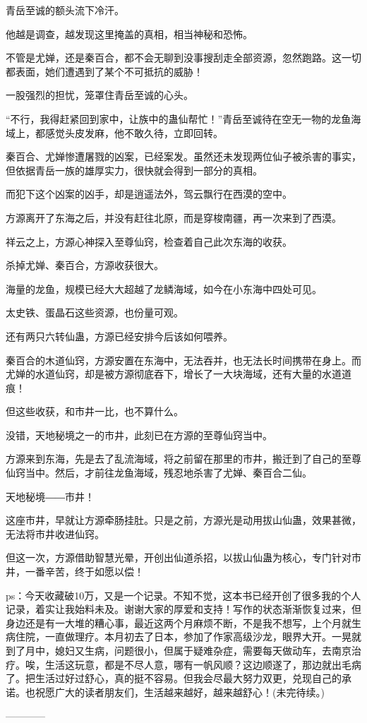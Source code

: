\begin{this_body}
青岳至诚的额头流下冷汗。

他越是调查，越发现这里掩盖的真相，相当神秘和恐怖。

不管是尤婵，还是秦百合，都不会无聊到没事搜刮走全部资源，忽然跑路。这一切都表面，她们遭遇到了某个不可抵抗的威胁！

一股强烈的担忧，笼罩住青岳至诚的心头。

“不行，我得赶紧回到家中，让族中的蛊仙帮忙！”青岳至诚待在空无一物的龙鱼海域上，都感觉头皮发麻，他不敢久待，立即回转。

秦百合、尤婵惨遭屠戮的凶案，已经案发。虽然还未发现两位仙子被杀害的事实，但依据青岳一族的雄厚实力，很快就会得到一部分的真相。

而犯下这个凶案的凶手，却是逍遥法外，驾云飘行在西漠的空中。

方源离开了东海之后，并没有赶往北原，而是穿梭南疆，再一次来到了西漠。

祥云之上，方源心神探入至尊仙窍，检查着自己此次东海的收获。

杀掉尤婵、秦百合，方源收获很大。

海量的龙鱼，规模已经大大超越了龙鳞海域，如今在小东海中四处可见。

太史铁、蛋晶石这些资源，也份量可观。

还有两只六转仙蛊，方源已经安排今后该如何喂养。

秦百合的木道仙窍，方源安置在东海中，无法吞并，也无法长时间携带在身上。而尤婵的水道仙窍，却是被方源彻底吞下，增长了一大块海域，还有大量的水道道痕！

但这些收获，和市井一比，也不算什么。

没错，天地秘境之一的市井，此刻已在方源的至尊仙窍当中。

方源来到东海，先是去了乱流海域，将之前留在那里的市井，搬迁到了自己的至尊仙窍当中。然后，才前往龙鱼海域，残忍地杀害了尤婵、秦百合二仙。

天地秘境――市井！

这座市井，早就让方源牵肠挂肚。只是之前，方源光是动用拔山仙蛊，效果甚微，无法将市井收进仙窍。

但这一次，方源借助智慧光晕，开创出仙道杀招，以拔山仙蛊为核心，专门针对市井，一番辛苦，终于如愿以偿！

ps：今天收藏破10万，又是一个记录。不知不觉，这本书已经开创了很多我的个人记录，着实让我始料未及。谢谢大家的厚爱和支持！写作的状态渐渐恢复过来，但身边还是有一大堆的糟心事，最近这两个月麻烦不断，不是我不想写，上个月就生病住院，一直做理疗。本月初去了日本，参加了作家高级沙龙，眼界大开。一晃就到了月中，媳妇又生病，问题很小，但属于疑难杂症，需要每天做动车，去南京治疗。唉，生活这玩意，都是不尽人意，哪有一帆风顺？这边顺遂了，那边就出毛病了。把生活过好过舒心，真的挺不容易。但我会尽最大努力双更，兑现自己的承诺。也祝愿广大的读者朋友们，生活越来越好，越来越舒心！(未完待续。)

------------

\end{this_body}

